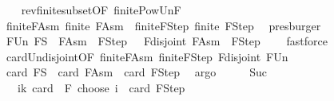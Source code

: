 \begin{isabellebody}
\ \ \isamarkupfalse%
\ rev{\isacharunderscore}{\kern0pt}finite{\isacharunderscore}{\kern0pt}subset{\isacharbrackleft}{\kern0pt}OF\ finite{\isacharunderscore}{\kern0pt}Pow{\isacharunderscore}{\kern0pt}Un{\isacharunderscore}{\kern0pt}F{\isacharbrackright}{\kern0pt}\ \isamarkupfalse%
\ finite{\isacharunderscore}{\kern0pt}F{\isacharunderscore}{\kern0pt}Asm{\isacharcolon}{\kern0pt}\ {\isachardoublequoteopen}finite\ {\isacharquery}{\kern0pt}F{\isacharunderscore}{\kern0pt}Asm{\isachardoublequoteclose}\ \ finite{\isacharunderscore}{\kern0pt}F{\isacharunderscore}{\kern0pt}Step{\isacharcolon}{\kern0pt}\ {\isachardoublequoteopen}finite\ {\isacharquery}{\kern0pt}F{\isacharunderscore}{\kern0pt}Step{\isachardoublequoteclose}\ \isamarkupfalse%
\ presburger{\isacharplus}{\kern0pt}\isanewline
\isanewline
\ \ \isamarkupfalse%
\ F{\isacharunderscore}{\kern0pt}Un{\isacharcolon}{\kern0pt}\ {\isachardoublequoteopen}{\isacharquery}{\kern0pt}FS\ {\isacharequal}{\kern0pt}\ {\isacharquery}{\kern0pt}F{\isacharunderscore}{\kern0pt}Asm\ {\isasymunion}\ {\isacharquery}{\kern0pt}F{\isacharunderscore}{\kern0pt}Step{\isachardoublequoteclose}\ \ \ F{\isacharunderscore}{\kern0pt}disjoint{\isacharcolon}{\kern0pt}\ {\isachardoublequoteopen}{\isacharquery}{\kern0pt}F{\isacharunderscore}{\kern0pt}Asm\ {\isasyminter}\ {\isacharquery}{\kern0pt}F{\isacharunderscore}{\kern0pt}Step\ {\isacharequal}{\kern0pt}\ {\isacharbraceleft}{\kern0pt}{\isacharbraceright}{\kern0pt}{\isachardoublequoteclose}\ \isamarkupfalse%
\ fastforce{\isacharplus}{\kern0pt}\isanewline
\ \ \isamarkupfalse%
\ card{\isacharunderscore}{\kern0pt}Un{\isacharunderscore}{\kern0pt}disjoint{\isacharbrackleft}{\kern0pt}OF\ finite{\isacharunderscore}{\kern0pt}F{\isacharunderscore}{\kern0pt}Asm\ finite{\isacharunderscore}{\kern0pt}F{\isacharunderscore}{\kern0pt}Step\ F{\isacharunderscore}{\kern0pt}disjoint{\isacharbrackright}{\kern0pt}\ F{\isacharunderscore}{\kern0pt}Un\ \isamarkupfalse%
\ {\isachardoublequoteopen}card\ {\isacharquery}{\kern0pt}FS\ {\isacharequal}{\kern0pt}\ card\ {\isacharquery}{\kern0pt}F{\isacharunderscore}{\kern0pt}Asm\ {\isacharplus}{\kern0pt}\ card\ {\isacharquery}{\kern0pt}F{\isacharunderscore}{\kern0pt}Step{\isachardoublequoteclose}\ \isamarkupfalse%
\ argo\isanewline
\ \ \isamarkupfalse%
\ \isamarkupfalse%
\ Suc\ \isamarkupfalse%
\ {\isachardoublequoteopen}{\isachardot}{\kern0pt}{\isachardot}{\kern0pt}{\isachardot}{\kern0pt}\ {\isacharequal}{\kern0pt}\ {\isacharparenleft}{\kern0pt}{\isasymSum}i{\isasymle}k{\isachardot}{\kern0pt}\ card\ {\isacharparenleft}{\kern0pt}{\isasymUnion}\ F{\isacharparenright}{\kern0pt}\ choose\ i{\isacharparenright}{\kern0pt}\ {\isacharplus}{\kern0pt}\ card\ {\isacharquery}{\kern0pt}F{\isacharunderscore}{\kern0pt}Step{\isachardoublequoteclose}\ \isamarkupfalse%

\end{isabellebody}
